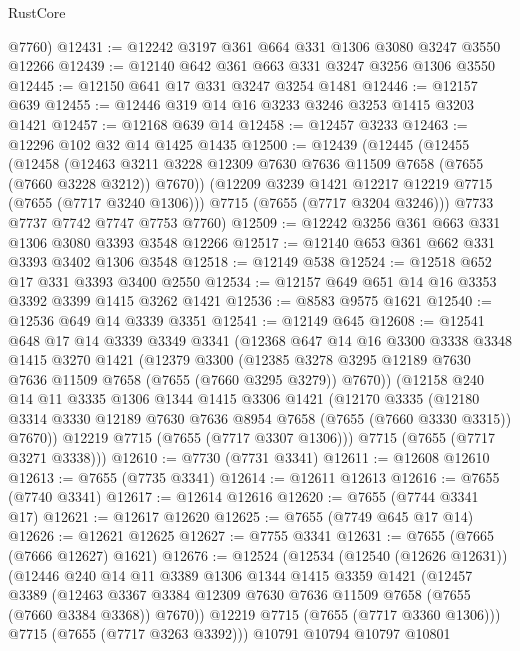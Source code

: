 \begin{lexlean}{RustCore}
\begin{coremodule}
      @7760)
@12431 := @12242 @3197 @361 @664 @331 @1306 @3080 @3247 @3550 @12266
@12439 := @12140 @642 @361 @663 @331 @3247 @3256 @1306 @3550
@12445 := @12150 @641 @17 @331 @3247 @3254 @1481
@12446 := @12157 @639
@12455 := @12446 @319 @14 @16 @3233 @3246 @3253 @1415 @3203 @1421
@12457 := @12168 @639 @14
@12458 := @12457 @3233
@12463 := @12296 @102 @32 @14 @1425 @1435
@12500 := @12439
    (@12445
      (@12455
        (@12458
          (@12463 @3211 @3228 @12309 @7630 @7636 @11509 @7658 (@7655 (@7660 @3228 @3212)) @7670))
        (@12209 @3239 @1421 @12217 @12219 @7715 (@7655 (@7717 @3240 @1306)))
        @7715
        (@7655 (@7717 @3204 @3246)))
      @7733
      @7737
      @7742
      @7747
      @7753
      @7760)
@12509 := @12242 @3256 @361 @663 @331 @1306 @3080 @3393 @3548 @12266
@12517 := @12140 @653 @361 @662 @331 @3393 @3402 @1306 @3548
@12518 := @12149 @538
@12524 := @12518 @652 @17 @331 @3393 @3400 @2550
@12534 := @12157 @649 @651 @14 @16 @3353 @3392 @3399 @1415 @3262 @1421
@12536 := @8583 @9575 @1621
@12540 := @12536 @649 @14 @3339 @3351
@12541 := @12149 @645
@12608 := @12541
    @648
    @17
    @14
    @3339
    @3349
    @3341
    (@12368
      @647
      @14
      @16
      @3300
      @3338
      @3348
      @1415
      @3270
      @1421
      (@12379
        @3300
        (@12385 @3278 @3295 @12189 @7630 @7636 @11509 @7658 (@7655 (@7660 @3295 @3279)) @7670))
      (@12158
        @240
        @14
        @11
        @3335
        @1306
        @1344
        @1415
        @3306
        @1421
        (@12170
          @3335
          (@12180 @3314 @3330 @12189 @7630 @7636 @8954 @7658 (@7655 (@7660 @3330 @3315)) @7670))
        @12219
        @7715
        (@7655 (@7717 @3307 @1306)))
      @7715
      (@7655 (@7717 @3271 @3338)))
@12610 := @7730 (@7731 @3341)
@12611 := @12608 @12610
@12613 := @7655 (@7735 @3341)
@12614 := @12611 @12613
@12616 := @7655 (@7740 @3341)
@12617 := @12614 @12616
@12620 := @7655 (@7744 @3341 @17)
@12621 := @12617 @12620
@12625 := @7655 (@7749 @645 @17 @14)
@12626 := @12621 @12625
@12627 := @7755 @3341
@12631 := @7655 (@7665 (@7666 @12627) @1621)
@12676 := @12524
    (@12534
      (@12540 (@12626 @12631))
      (@12446
        @240
        @14
        @11
        @3389
        @1306
        @1344
        @1415
        @3359
        @1421
        (@12457
          @3389
          (@12463 @3367 @3384 @12309 @7630 @7636 @11509 @7658 (@7655 (@7660 @3384 @3368)) @7670))
        @12219
        @7715
        (@7655 (@7717 @3360 @1306)))
      @7715
      (@7655 (@7717 @3263 @3392)))
    @10791
    @10794
    @10797
    @10801

\end{coremodule}
\end{lexlean}
